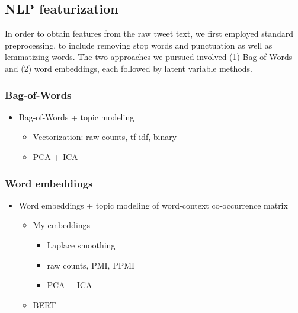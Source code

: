 \documentclass{article}
\begin{document}
\hypertarget{nlp-featurization}{%
\subsection{NLP featurization}\label{nlp-featurization}}

In order to obtain features from the raw tweet text, we first employed
standard preprocessing, to include removing stop words and punctuation
as well as lemmatizing words. The two approaches we pursued involved (1)
Bag-of-Words and (2) word embeddings, each followed by latent variable
methods.

\hypertarget{bag-of-words}{%
\subsubsection{Bag-of-Words}\label{bag-of-words}}

\begin{itemize}
\tightlist
\item
  Bag-of-Words + topic modeling

  \begin{itemize}
  \tightlist
  \item
    Vectorization: raw counts, tf-idf, binary
  \item
    PCA + ICA
  \end{itemize}
\end{itemize}

\hypertarget{word-embeddings}{%
\subsubsection{Word embeddings}\label{word-embeddings}}

\begin{itemize}
\tightlist
\item
  Word embeddings + topic modeling of word-context co-occurrence matrix

  \begin{itemize}
  \tightlist
  \item
    My embeddings

    \begin{itemize}
    \tightlist
    \item
      Laplace smoothing
    \item
      raw counts, PMI, PPMI
    \item
      PCA + ICA
    \end{itemize}
  \item
    BERT
  \end{itemize}
\end{itemize}
\end{document}
